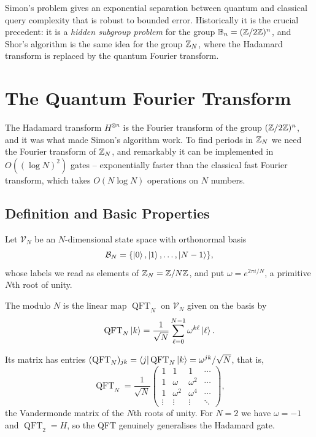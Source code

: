 \documentclass[a4paper]{scrartcl}
\newcommand{\QFT}{\operatorname{QFT}}
\newcommand{\Vs}{\mathcal{V}}
\newcommand{\Bs}{\mathcal{B}}
\newcommand{\bits}[1]{\mathbb{B}_{#1}}
\begin{document}
Simon's problem gives an exponential separation between quantum and classical query complexity that is robust to bounded error. Historically it is the crucial precedent: it is a \emph{hidden subgroup problem} for the group $\bits n = (\Z/2\Z)^n$, and Shor's algorithm is the same idea for the group $\mathbb{Z}_N$, where the Hadamard transform is replaced by the quantum Fourier transform.

\section{The Quantum Fourier Transform}

The Hadamard transform $H^{\otimes n}$ is the Fourier transform of the group $(\mathbb{Z}/2\mathbb{Z})^n$, and it was what made Simon's algorithm work. To find periods in $\mathbb{Z}_N$ we need the Fourier transform of $\mathbb{Z}_N$, and remarkably it can be implemented in $O((\log N)^2)$ gates -- exponentially faster than the classical fast Fourier transform, which takes $O(N\log N)$ operations on $N$ numbers.

\subsection{Definition and Basic Properties}

Let $\Vs_N$ be an $N$-dimensional state space with orthonormal basis
$$\Bs_N = \{\ket0,\ket1,\dots,\ket{N-1}\},$$
whose labels we read as elements of $\mathbb{Z}_N = \mathbb{Z}/N\mathbb{Z}$, and put $\omega = e^{2\pi i/N}$, a primitive $N$th root of unity.

\begin{definition}
	The  modulo $N$ is the linear map $\QFT_N$ on $\Vs_N$ given on the basis by
	$$\QFT_N\ket{k} = \frac1{\sqrt N}\sum_{\ell = 0}^{N-1}\omega^{k\ell}\ket\ell.$$
\end{definition}

Its matrix has entries $(\QFT_N)_{jk} = \bra j\QFT_N\ket k = \omega^{jk}/\sqrt N$, that is,
$$\QFT_N = \frac1{\sqrt N}\begin{pmatrix} 1 & 1 & 1 & \cdots \\ 1 & \omega & \omega^2&\cdots\\ 1&\omega^2&\omega^4&\cdots\\ \vdots&\vdots&\vdots&\ddots\end{pmatrix},$$
the Vandermonde matrix of the $N$th roots of unity. For $N = 2$ we have $\omega = -1$ and $\QFT_2 = H$, so the QFT genuinely generalises the Hadamard gate.
\end{document}
